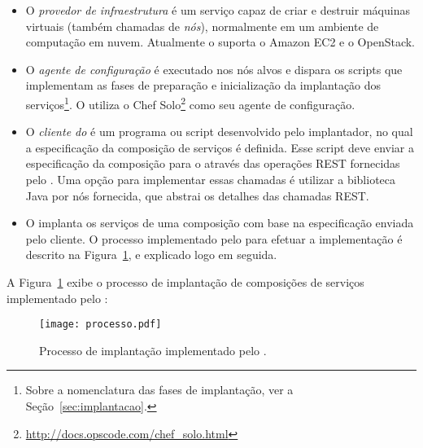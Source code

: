\begin{itemize}

\item O \emph{provedor de infraestrutura} é um serviço capaz de criar e destruir máquinas virtuais 
(também chamadas de \emph{nós}), normalmente em um ambiente de computação em nuvem. 
Atualmente o \ee suporta o Amazon EC2 e o OpenStack.

\item O \emph{agente de configuração} é executado nos nós alvos
e dispara os scripts que implementam as fases de preparação
e inicialização da implantação dos serviços\footnote{Sobre a nomenclatura das fases de implantação, ver a Seção~\ref{sec:implantacao}.}.
O \ee utiliza o Chef Solo\footnote{\url{http://docs.opscode.com/chef_solo.html}}
como seu agente de configuração.

\item O \emph{cliente do \ee} é um programa ou script desenvolvido
pelo implantador, no qual a especificação da composição de serviços é definida.
Esse script deve enviar a especificação da composição para o \ee
através das operações REST fornecidas pelo \ee.
Uma opção para implementar essas chamadas é utilizar
a biblioteca Java por nós fornecida, que abstrai os detalhes
das chamadas REST.

\item O \emph{\ee} implanta os serviços de uma composição
com base na especificação enviada pelo cliente.
O processo implementado pelo \ee para efetuar a implementação
é descrito na Figura~\ref{fig:processo}, e explicado logo em seguida. 

\end{itemize} 

A Figura~\ref{fig:processo} exibe o processo de implantação de composições
de serviços implementado pelo \ee:

\begin{figure}[ht]
\centering
\texttt{[image: processo.pdf]}
\caption{Processo de implantação implementado pelo \ee.}
\label{fig:processo}
\end{figure}

